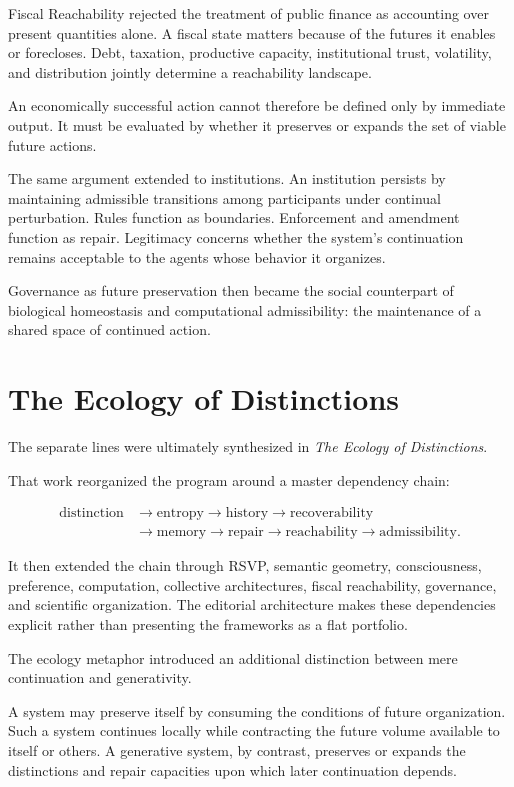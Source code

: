 \documentclass[11pt,oneside]{book}
\numberwithin{equation}{chapter}
\theoremstyle{definition}
\theoremstyle{plain}
\begin{document}
Fiscal Reachability rejected the treatment of public finance as accounting
over present quantities alone. A fiscal state matters because of the
futures it enables or forecloses. Debt, taxation, productive capacity,
institutional trust, volatility, and distribution jointly determine a
reachability landscape.

An economically successful action cannot therefore be defined only by
immediate output. It must be evaluated by whether it preserves or expands
the set of viable future actions.

The same argument extended to institutions. An institution persists by
maintaining admissible transitions among participants under continual
perturbation. Rules function as boundaries. Enforcement and amendment
function as repair. Legitimacy concerns whether the system's continuation
remains acceptable to the agents whose behavior it organizes.

Governance as future preservation then became the social counterpart of
biological homeostasis and computational admissibility: the maintenance of
a shared space of continued action.

\section{The Ecology of Distinctions}

The separate lines were ultimately synthesized in \emph{The Ecology of
Distinctions}.

That work reorganized the program around a master dependency chain:

\[
\begin{aligned}
\text{distinction}
&\rightarrow
\text{entropy}
\rightarrow
\text{history}
\rightarrow
\text{recoverability}
\\
&\rightarrow
\text{memory}
\rightarrow
\text{repair}
\rightarrow
\text{reachability}
\rightarrow
\text{admissibility}.
\end{aligned}
\]

It then extended the chain through RSVP, semantic geometry, consciousness,
preference, computation, collective architectures, fiscal reachability,
governance, and scientific organization. The editorial architecture makes
these dependencies explicit rather than presenting the frameworks as a flat
portfolio.

The ecology metaphor introduced an additional distinction between mere
continuation and generativity.

A system may preserve itself by consuming the conditions of future
organization. Such a system continues locally while contracting the future
volume available to itself or others. A generative system, by contrast,
preserves or expands the distinctions and repair capacities upon which
later continuation depends.
\end{document}

